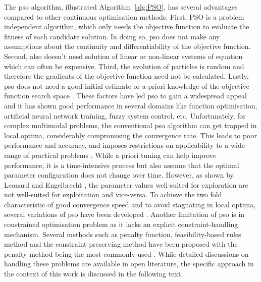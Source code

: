 	The \gls{pso} algorithm, illustrated Algorithm~\ref{alg:PSO}, has several advantages compared to other continuous optimisation methods. First, PSO is a problem independent algorithm, which only needs the objective function to evaluate the fitness of each candidate solution. In doing so, \gls{pso} does not make any assumptions about the continuity and differentiability of the objective function. Second, also doesn't need solution of linear or non-linear systems of equation which can often be expensive. Third, the evolution of particles is random and therefore the gradients of the objective function need not be calculated. Lastly, \gls{pso} does not need a good initial estimate or a-priori knowledge of the objective function search space \cite{Freitas:2020aa}. These factors have led \gls{pso} to gain a widespread appeal and it has shown good performance in several domains like function optimisation, artificial neural network training, fuzzy system control, etc. Unfortunately, for complex multimodal problems, the conventional \gls{pso} algorithm can get trapped in local optima, considerably compromising the convergence rate. This leads to poor performance and accuracy, and imposes restrictions on applicability to a wide range of practical problems \cite{Xu:2013aa,Harrison:2018aa}. While a priori tuning can help improve performance, it is a time-intensive process but also assume that the optimal parameter configuration does not change over time. However, as shown by Leonard and Engelbrecht \cite{Leonard:2013aa}, the parameter values well-suited for exploration are not well-suited for exploitation and vice-versa. To achieve the two fold characteristic of good convergence speed and to avoid stagnating in local optima, several variations of \gls{pso} have been developed \cite{Shi:1998aa,Ratnaweera:2004aa,Chatterjee:2006aa,Fan:2007aa,van-den-Bergh:2001aa}. Another limitation of \gls{pso} is in constrained optimisation problem as it lacks an explicit constraint-handling mechanism. Several methods such as penalty function, feasibility-based rules method and the constraint-preserving method have been proposed with the penalty method being the most commonly used \cite{Sun:2011aa,Jordehi:2015aa}. While detailed discussions on handling these problems are available in open literature, the specific approach in the context of this work is discussed in the following text. 	
	
